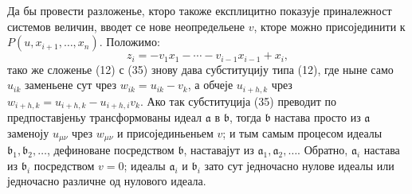 \documentclass[11pt]{article}
\providecommand{\aideal}{\mathfrak a}
\providecommand{\bideal}{\mathfrak b}
\begin{document}
Да бы провести разложенье, кторо такоже експлицитно показује приналежност системов величин, вводет се нове неопредельене $v$, кторе можно присојединити к $P(u,x_{i+1},\ldots,x_n)$. Положимо:
\begin{equation}
 z_i=-v_1x_1-\cdots-v_{i-1}x_{i-1}+x_i,
\tag{35}
\end{equation}
тако же сложенье (12) с (35) знову дава субституцију типа (12), где ныне само $u_{ik}$ заменьене сут чрез $w_{ik}=u_{ik}-v_k$, а обчеје $u_{i+h,k}$ чрез $w_{i+h,k}=u_{i+h,k}-u_{i+h,i}v_k$. Ако так субституција (35) преводит по предпоставјеньу трансформованы идеал $\aideal$ в $\bideal$, тогда $\bideal$ настава просто из $\aideal$ заменоју $u_{\mu\nu}$ чрез $w_{\mu\nu}$ и присојединьеньем $v$; и тым самым процесом идеалы $\bideal_1,\bideal_2,\ldots$, дефиноване посредством $\bideal$, наставајут из $\aideal_1,\aideal_2,\ldots$. Обратно, $\aideal_i$ настава из $\bideal_i$ посредством $v=0$; идеалы $\aideal_i$ и $\bideal_i$ зато сут једночасно нулове идеалы или једночасно различне од нулового идеала.
\end{document}
